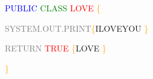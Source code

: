 \begingroup
\thispagestyle{empty}
\vspace*{5cm}
\par\normalfont\fontsize{25}{25}\sffamily\selectfont

\textcolor{blue}{PUBLIC} \textcolor{green}{CLASS} \textcolor{red}{LOVE} \textcolor{orange}{\{}

\textcolor{gray}{SYSTEM.OUT.PRINT}\textcolor{orange}{\{}ILOVEYOU \textcolor{orange}{\}}

\textcolor{gray}{RETURN} \textcolor{red}{TRUE} \textcolor{orange}{\{}LOVE \textcolor{orange}{\}}

\textcolor{orange}{\}}

\endgroup
